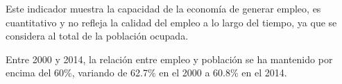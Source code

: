  Este indicador muestra la capacidad de la economía de generar empleo, es cuantitativo y no refleja la calidad del empleo a lo largo del tiempo, ya que se considera al total de la población ocupada. 

 Entre 2000 y 2014, la relación entre empleo y población se ha mantenido por encima del 60\%, variando de 62.7\% en el 2000 a 60.8\% en el 2014.